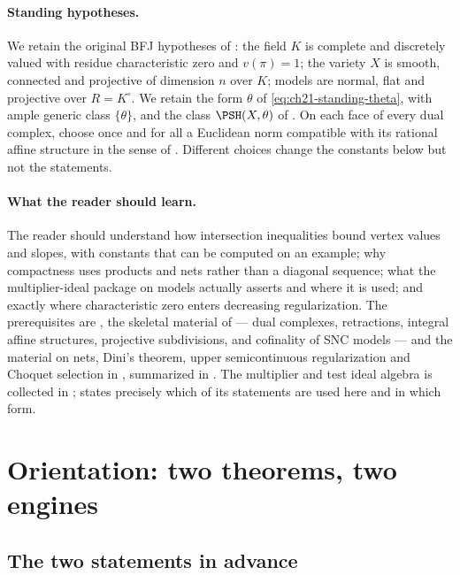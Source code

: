 \paragraph{Standing hypotheses.}
We retain the original BFJ hypotheses of : the
field $K$ is complete and discretely valued with residue characteristic
zero and $v(\pi)=1$; the variety $X$ is smooth, connected and projective
of dimension $n$ over $K$; models are normal, flat and projective over
$R=K^\circ$.  We retain the form $\theta$ of
\eqref{eq:ch21-standing-theta}, with ample generic class $\{\theta\}$, and
the class $\PSH(X,\theta)$ of .  On each face of
every dual complex, choose once and for all a Euclidean norm compatible with
its rational affine structure in the sense of
.  Different choices change the constants below but
not the statements.

\paragraph{What the reader should learn.}
The reader should understand how intersection inequalities bound vertex
values and slopes, with constants that can be computed on an example; why
compactness uses products and nets rather than a diagonal sequence; what
the multiplier-ideal package on models actually asserts and where it is
used; and exactly where characteristic zero enters decreasing
regularization.  The prerequisites are
, the skeletal material of
 --- dual complexes, retractions, integral affine
structures, projective subdivisions, and cofinality of SNC models --- and
the material on nets, Dini's theorem, upper semicontinuous regularization
and Choquet selection in , summarized in
.  The multiplier and test ideal algebra is collected in
;  states precisely which of its
statements are used here and in which form.

\section{Orientation: two theorems, two engines}
\label{sec:ch22-orientation}

\subsection{The two statements in advance}
\label{sec:ch22-statements-preview}


